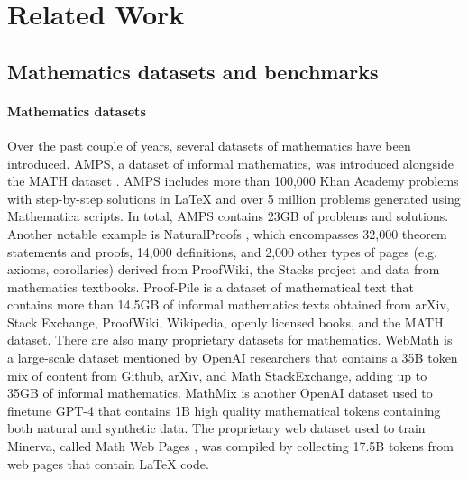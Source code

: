 \section{Related Work}
\subsection{Mathematics datasets and benchmarks} 
\paragraph{Mathematics datasets} Over the past couple of years, several datasets of mathematics have been introduced. AMPS, a dataset of informal mathematics, was introduced alongside the MATH dataset \citep{mathdataset}. AMPS includes more than 100,000 Khan Academy problems with step-by-step solutions in LaTeX and over 5 million problems generated using Mathematica scripts. In total, AMPS contains 23GB of problems and solutions. Another notable example is NaturalProofs \citep{welleck2021naturalproofs}, which encompasses 32,000 theorem statements and proofs, 14,000 definitions, and 2,000 other types of pages (e.g. axioms, corollaries) derived from ProofWiki, the Stacks project and data from mathematics textbooks. Proof-Pile \citep{azerbayev2023proofnet} is a dataset of mathematical text that contains more than 14.5GB of informal mathematics texts obtained from arXiv, Stack Exchange, ProofWiki, Wikipedia, openly licensed books, and the MATH dataset. There are also many proprietary datasets for mathematics. WebMath is a large-scale dataset mentioned by OpenAI researchers \citep{polu2020generative} that contains a 35B token mix of content from Github, arXiv, and Math StackExchange, adding up to 35GB of informal mathematics. MathMix is another OpenAI dataset used to finetune GPT-4 \citep{verify-step-by-step} that contains 1B high quality mathematical tokens containing both natural and synthetic data. The proprietary web dataset used to train Minerva, called Math Web Pages \citep{lewkowycz2022solving}, was compiled by collecting 17.5B tokens from web pages that contain \LaTeX{} code.

